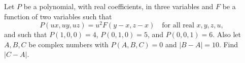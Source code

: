 Let $P$ be a polynomial, with real coefficients, in three variables
and $F$ be a function of two variables such that
\[
P(ux, uy, uz) = u^2 F(y-x,z-x) \quad \mbox{for all real $x,y,z,u$},
\]
and such that $P(1,0,0)=4$, $P(0,1,0)=5$, and $P(0,0,1)=6$. Also let
$A,B,C$ be complex numbers with $P(A,B,C)=0$ and $|B-A|=10$. Find $|C-A|$.
